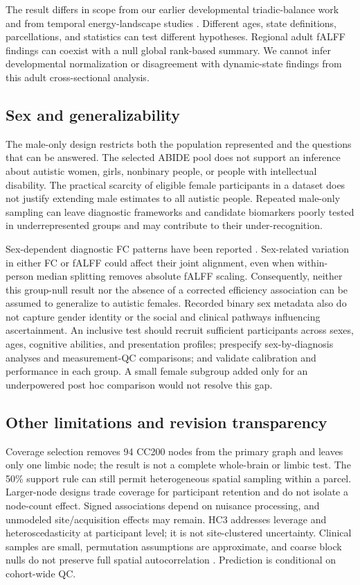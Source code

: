 \documentclass[10pt,letterpaper]{article}
\begin{document}
The result differs in scope from our earlier developmental triadic-balance work
\cite{Moradimanesh2021} and from temporal energy-landscape studies
\cite{Watanabe2017revision}. Different ages, state definitions, parcellations, and
statistics can test different hypotheses. Regional adult fALFF findings
\cite{Itahashi2015revision} can coexist with a null global rank-based summary.
We cannot infer developmental normalization or disagreement with dynamic-state
findings from this adult cross-sectional analysis.

\subsection*{Sex and generalizability}
The male-only design restricts both the population represented and the questions
that can be answered. The selected ABIDE pool does not support an inference about
autistic women, girls, nonbinary people, or people with intellectual disability.
The practical scarcity of eligible female participants in a dataset does not
justify extending male estimates to all autistic people. Repeated male-only
sampling can leave diagnostic frameworks and candidate biomarkers poorly tested
in underrepresented groups and may contribute to their under-recognition.

Sex-dependent diagnostic FC patterns have been reported \cite{Alaerts2016revision}.
Sex-related variation in either FC or fALFF could affect their joint alignment,
even when within-person median splitting removes absolute fALFF scaling.
Consequently, neither this group-null result nor the absence of a corrected
efficiency association can be assumed to generalize to autistic females.
Recorded binary sex metadata also do not capture gender identity or the social
and clinical pathways influencing ascertainment. An inclusive test should recruit
sufficient participants across sexes, ages, cognitive abilities, and presentation
profiles; prespecify sex-by-diagnosis analyses and measurement-QC comparisons;
and validate calibration and performance in each group. A small female subgroup
added only for an underpowered post hoc comparison would not resolve this gap.

\subsection*{Other limitations and revision transparency}
Coverage selection removes 94 CC200 nodes from the primary graph and leaves only
one limbic node; the result is not a complete whole-brain or limbic test. The
50\% support rule can still permit heterogeneous spatial sampling within a parcel.
Larger-node designs trade coverage for participant retention and do not isolate
a node-count effect. Signed associations depend on nuisance processing, and
unmodeled site/acquisition effects may remain. HC3 addresses leverage and
heteroscedasticity at participant level; it is not site-clustered uncertainty.
Clinical samples are small, permutation assumptions are approximate, and coarse
block nulls do not preserve full spatial autocorrelation
\cite{Markello2021revision}. Prediction is conditional on cohort-wide QC.
\end{document}
